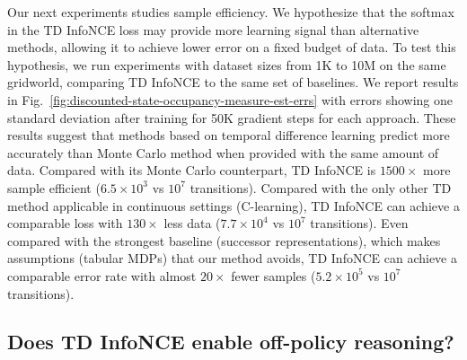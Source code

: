 \documentclass{article} %
\begin{document}
Our next experiments studies sample efficiency. We hypothesize that the softmax in the TD InfoNCE loss may provide more learning signal than alternative methods, allowing it to achieve lower error on a fixed budget of data.
To test this hypothesis, we run experiments with dataset sizes from 1K to 10M on the same gridworld, comparing TD InfoNCE to the same set of baselines. We report results in Fig.~\ref{fig:discounted-state-occupancy-measure-est-errs} with errors showing one standard deviation after training for 50K gradient steps for each approach. These results suggest that methods based on temporal difference learning predict more accurately than Monte Carlo method when provided with the same amount of data.
Compared with its Monte Carlo counterpart, TD InfoNCE is $1500\times$ more sample efficient ($6.5 \times 10^3$ vs $10^7$ transitions).
Compared with the only other TD method applicable in continuous settings (C-learning), TD InfoNCE can achieve a comparable loss with $130\times$ less data ($7.7 \times 10^4$ vs $10^7$ transitions).
Even compared with the strongest baseline (successor representations), which makes assumptions (tabular MDPs) that our method avoids, TD InfoNCE can achieve a comparable error rate with almost $20 \times$ fewer samples ($5.2 \times 10^5$ vs $10^7$ transitions).


\subsection{Does TD InfoNCE enable off-policy reasoning?}
\label{subsec:off-policy-reasoning}
\end{document}

